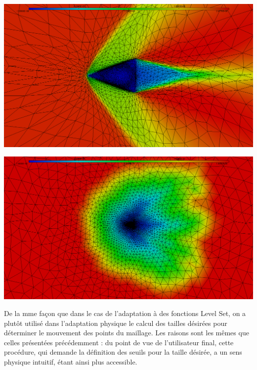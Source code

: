 \indent

\begingroup
	\begin{minipage}[t]{.5\linewidth}
		\includegraphics[scale=.15]{Bordeaux/figures/AdapPhysique/u.png}
	\end{minipage}
	\hfill
	\begin{minipage}[t]{.5\linewidth}
		\includegraphics[scale=.15]{Bordeaux/figures/AdapPhysique/met.png}
	\end{minipage}	
\endgroup

\indent

\indent De la mme façon que dans le cas de l'adaptation à des fonctions Level Set, on a plutôt utilisé dans l'adaptation physique le calcul des tailles désirées pour déterminer le mouvement des points du maillage. Les raisons sont les mêmes que celles présentées précédemment : du point de vue de l'utilisateur final, cette procédure, qui demande la définition des seuils pour la taille désirée, a un sens physique intuitif, étant ainsi plus accessible.

